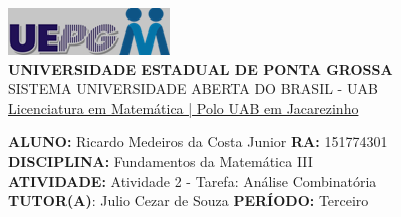 \documentclass[a4paper, 12pt]{article}
\begin{document}
\begin{flushleft}\includegraphics{logo}\\
\textbf{UNIVERSIDADE ESTADUAL DE PONTA GROSSA} \\
SISTEMA UNIVERSIDADE ABERTA DO BRASIL - UAB \\
\underline{Licenciatura em Matemática | Polo UAB em Jacarezinho}\end{flushleft} 
\textbf{ALUNO:} Ricardo Medeiros da Costa Junior   \textbf{RA:} 151774301 \\
\textbf{DISCIPLINA:} Fundamentos da Matemática III \\
\textbf{ATIVIDADE:} Atividade 2 - Tarefa: Análise Combinatória \\
\textbf{TUTOR(A)}: Julio Cezar de Souza
\textbf{PERÍODO:} Terceiro
\end{document}
